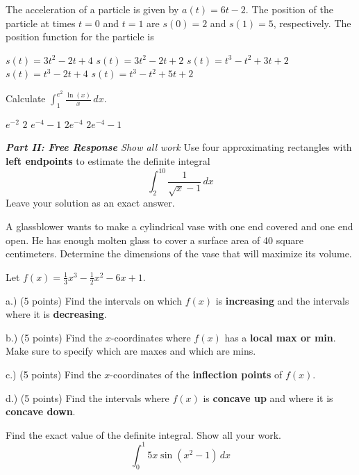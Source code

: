 \documentclass[11pt]{article}
\begin{document}
\begin{questions}
\begin{multiplechoice}{5}
\question The acceleration of a particle is given by $a(t) = 6t - 2$.  The position
of the particle at times $t = 0$ and $t = 1$ are $s(0) = 2$ and $s(1) = 5$, respectively.  
The position function for the particle is
\begin{answers}{2}
\ans $s(t) = 3t^2 - 2t + 4$
\ans $s(t) = 3t^2 - 2t + 2$
\ans $s(t) = t^3 - t^2 + 3t + 2$
\ans $s(t) = t^3 - 2t + 4$
\ans $s(t) = t^3 - t^2 + 5t + 2$
\end{answers}

\question Calculate $\int_1^{e^2} \frac{\ln(x)}{x} \, dx$.
\begin{answers}{2}
\ans $e^{-2}$
\ans $2$
\ans $e^{-4} - 1$ 
\ans $2e^{-4}$
\ans $2e^{-4} - 1$
\end{answers}

\end{multiplechoice}
\vspace{.2in}

\newpage

\noindent \emph{{\bf Part II: Free Response}{  Show all work}}
\question[10] Use four approximating rectangles with \textbf{left endpoints} to
estimate the definite integral
$$\int_2^{10} \frac{1}{\sqrt{x} - 1} \, dx$$
Leave your solution as an exact answer.


\newpage


\question[12] A glassblower wants to make a cylindrical vase with one end covered and one end open.  He has enough molten glass to cover a surface area of 40 square centimeters.  Determine the dimensions of the vase that will maximize its volume.

\newpage


\question[20]  Let $f(x) = \frac{1}{3}x^3 - \frac{1}{2}x^2 - 6x  + 1$.

a.) (5 points) Find the intervals on which $f(x)$ is
 \textbf{increasing} and the intervals where it is 
\textbf{decreasing}.

\vspace{2in}


b.) (5 points) Find the $x$-coordinates where $f(x)$
has a \textbf{local max or min}.  Make sure to
specify which are maxes and which are mins.

\vspace{2in}

c.) (5 points) Find the $x$-coordinates of the \textbf{inflection
points} of $f(x)$.

\vspace{2in}

d.)  (5 points) Find the intervals where
$f(x)$ is \textbf{concave up} and where it is
\textbf{concave down}.

\newpage

\question[10]  Find the exact value of the definite integral. Show all your work.
$$\int_0^1 5x \sin(x^2 -1) \, dx$$


\mbox{}
\end{questions}
\end{document}
